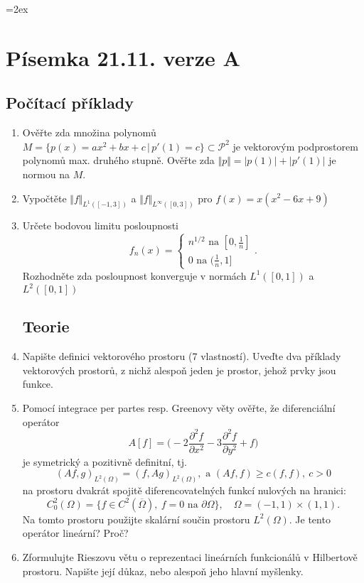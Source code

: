 \documentclass[a4paper,10pt]{article}
\def\abs#1{\lvert#1\rvert}
\def\norm#1{\bigl\Vert#1\bigr\Vert} %
\def\close#1{\overline{#1}}
\def\where{\,|\,}                    %
\def\prtl{\partial}                                        %
\begin{document}
\parskip=2ex
\parindent=0pt
\pagestyle{empty}
\section{Písemka 21.11. verze A}
\subsection{Počítací příklady}
\begin{enumerate}
 \item Ověřte zda množina polynomů $M=\{p(x)=ax^2+bx+c\where p'(1)=c\}\subset \mathcal P^2$ je vektorovým podprostorem polynomů max. druhého stupně.
 Ověřte zda $\norm{p}=\abs{p(1)}+\abs{p'(1)}$ je normou na $M$.
 \item Vypočtěte $\norm{f}_{L^1([-1,3])}$ a $\norm{f}_{L^\infty([0,3])}$ pro $f(x)=x(x^2-6x+9)$
 \item Určete bodovou limitu posloupnosti
 		\[f_n(x)=
                \left\{\begin{aligned}
                        n^{1/2} \text{ na $[0,\frac1n]$}\\
                        0 \text{ na $(\frac1n,1]$}
                       \end{aligned}\right. .
               \]
        Rozhodněte zda posloupnost konverguje  v normách $L^1([0,1])$ a $L^2([0,1])$

\subsection{Teorie}
\item Napište definici vektorového prostoru (7 vlastností). Uveďte dva příklady vektorových prostorů, z nichž alespoň jeden je prostor,
jehož prvky jsou funkce.

\item  Pomocí integrace per partes resp. Greenovy věty ověřte, že diferenciální operátor 
\[
A[f]=\big(-2\frac{\prtl^2 f}{\prtl x^2} -3\frac{\prtl^2 f}{\prtl y^2} +  f\big)
\]
je symetrický a pozitivně definitní, tj. 
\[
    (Af,g)_{L^2(\Omega)}=(f,Ag)_{L^2(\Omega)},\text{ a } (Af,f) \ge c(f,f),\ c>0
\]
na prostoru dvakrát spojitě diferencovatelných funkcí nulových na hranici:
\[
C^2_0(\Omega)=\{ f\in C^2(\close{\Omega}),\ f=0 \text{ na }\prtl\Omega\},\quad \Omega=(-1,1)\times(1,1).
\]
Na tomto prostoru použijte skalární součin prostoru $L^2(\Omega)$. Je tento operátor lineární? Proč?

\item Zformulujte Rieszovu větu o reprezentaci lineárních funkcionálů v Hilbertově prostoru. Napište její důkaz, nebo alespoň jeho hlavní myšlenky.


\end{enumerate}
\end{document}
